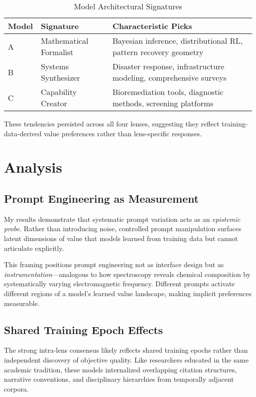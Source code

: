 \documentclass{article}
\begin{document}
\begin{table}[h]
\centering
\caption{Model Architectural Signatures}
\begin{tabular}{p{1cm}p{2.5cm}p{3.5cm}}
\toprule
\textbf{Model} & \textbf{Signature} & \textbf{Characteristic Picks} \\
\midrule
A & Mathematical Formalist & Bayesian inference, distributional RL, pattern recovery geometry \\
B & Systems Synthesizer & Disaster response, infrastructure modeling, comprehensive surveys \\
C & Capability Creator & Bioremediation tools, diagnostic methods, screening platforms \\
\bottomrule
\end{tabular}
\end{table}

These tendencies persisted across all four lenses, suggesting they reflect training-data-derived value preferences rather than lens-specific responses.

\section{Analysis}

\subsection{Prompt Engineering as Measurement}

My results demonstrate that systematic prompt variation acts as an \textit{epistemic probe}. Rather than introducing noise, controlled prompt manipulation surfaces latent dimensions of value that models learned from training data but cannot articulate explicitly.

This framing positions prompt engineering not as interface design but as \textit{instrumentation}—analogous to how spectroscopy reveals chemical composition by systematically varying electromagnetic frequency. Different prompts activate different regions of a model's learned value landscape, making implicit preferences measurable.

\subsection{Shared Training Epoch Effects}

The strong intra-lens consensus likely reflects shared training epochs rather than independent discovery of objective quality. Like researchers educated in the same academic tradition, these models internalized overlapping citation structures, narrative conventions, and disciplinary hierarchies from temporally adjacent corpora.
\end{document}
